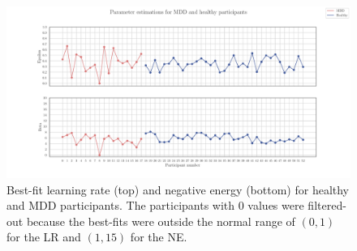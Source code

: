 \documentclass[12pt]{article}
\newtheorem*{theorem}{Theorem}
\begin{document}
\begin{figure}[h!]
	\centering
	\hspace*{-0.6in}
	\includegraphics[width=1.1\linewidth]{figures/2.4.pdf}
	\caption{Best-fit learning rate (top) and negative energy (bottom) for healthy and MDD participants. The participants with 0 values were filtered-out because the best-fits were outside the normal range of $(0,1)$ for the LR and $(1, 15)$ for the NE.}
	\label{fig:2.4}
\end{figure}








\end{document}
